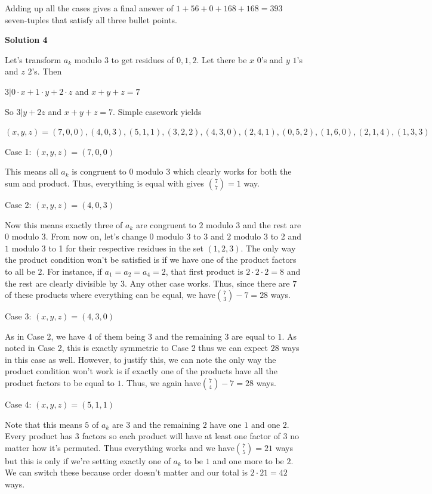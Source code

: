 \begin{enumerate}
 


 Adding up all the cases gives a final answer of $1+56+0+168+168 = \boxed{393}$ seven-tuples that satisfy all three bullet points.

 



\textbf{Solution 4}

Let's transform $a_k$ modulo $3$ to get residues of $0, 1, 2$. Let there be $x$ $0$'s and $y$ $1$'s and $z$ $2$'s. Then

 $3|0 \cdot x + 1 \cdot y + 2 \cdot z$ and $x + y + z = 7$

 So $3| y + 2z$ and $x + y + z = 7$. Simple casework yields

 $(x, y, z) = (7, 0, 0), (4, 0, 3), (5, 1, 1), (3, 2, 2), (4, 3, 0), (2, 4, 1), (0, 5, 2), (1, 6, 0), (2, 1, 4), (1, 3, 3)$

 Case 1: $(x, y, z) = (7, 0, 0)$

 This means all $a_k$ is congruent to $0$ modulo $3$ which clearly works for both the sum and product. Thus, everything is equal with gives $\binom{7}{7} = 1$ way.

 Case 2: $(x, y, z) = (4, 0, 3)$

 Now this means exactly three of $a_k$ are congruent to $2$ modulo $3$ and the rest are $0$ modulo $3$. From now on, let's change $0$ modulo $3$ to $3$ and $2$ modulo $3$ to 2 and $1$ modulo $3$ to 1 for their respective residues in the set $(1, 2, 3)$. The only way the product condition won't be satisfied is if we have one of the product factors to all be $2$. For instance, if $a_1 = a_2 = a_4 = 2$, that first product is $2 \cdot 2 \cdot 2 = 8$ and the rest are clearly divisible by $3$. Any other case works. Thus, since there are $7$ of these products where everything can be equal, we have$\binom{7}{3} - 7 = 28$ ways.

 Case 3: $(x, y, z) = (4, 3, 0)$

 As in Case 2, we have $4$ of them being $3$ and the remaining $3$ are equal to $1$. As noted in Case 2, this is exactly symmetric to Case 2 thus we can expect $28$ ways in this case as well. However, to justify this, we can note the only way the product condition won't work is if exactly one of the products have all the product factors to be equal to $1$. Thus, we again have$\binom{7}{4} - 7 = 28$ ways.

 Case 4: $(x, y, z) = (5, 1, 1)$

 Note that this means $5$ of $a_k$ are $3$ and the remaining $2$ have one $1$ and one $2$. Every product has $3$ factors so each product will have at least one factor of $3$ no matter how it's permuted. Thus everything works and we have$\binom{7}{5} = 21$ ways but this is only if we're setting exactly one of $a_k$ to be $1$ and one more to be $2$. We can switch these because order doesn't matter and our total is $2 \cdot 21 = 42$ ways.


\end{enumerate}
